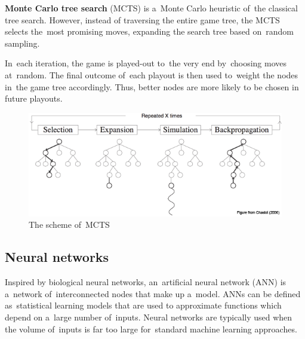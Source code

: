 \textbf{Monte Carlo tree search} (MCTS) is a~Monte Carlo heuristic of~the classical tree search.
However, instead of traversing the entire game tree, the MCTS selects the~most promising moves, expanding the search tree based on~random sampling.

In~each iteration, the game is played-out to~the very end by~choosing moves at~random.
The final outcome of~each playout is then used to~weight the nodes in~the game tree accordingly.
Thus, better nodes are more likely to be chosen in future playouts.

\begin{figure}[H]
  \centering
  \includegraphics[width=.6\textwidth]{../img/MCTS.png}
  \caption{The scheme of~MCTS}
  \label{fig:MCTS}
\end{figure}

\subsection{Neural networks}

Inspired by biological neural networks, an~artificial neural network (ANN) is a~network of~interconnected nodes that make up a~model.
ANNs can be defined as~statistical learning models that are used to approximate functions which depend on a~large number of~inputs.
Neural networks are typically used when the volume of~inputs is far too large for~standard machine learning approaches.

